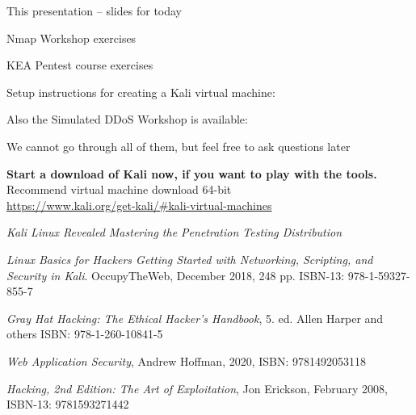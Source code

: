 \documentclass[Screen16to9,17pt]{foils}
\begin{document}

\begin{list2}
\item This presentation -- slides for today


\item Nmap Workshop exercises\\{\footnotesize
{}}
\item KEA Pentest course exercises\\{\footnotesize
{}}
\item Setup instructions for creating a Kali virtual machine:\\
\item Also the Simulated DDoS Workshop is available:\\{\footnotesize
{}}

\end{list2}

\centerline{We cannot go through all of them, but feel free to ask questions later}

{\bf Start a download of Kali now, if you want to play with the tools.}\\
Recommend virtual machine download 64-bit\\
 \url{https://www.kali.org/get-kali/#kali-virtual-machines}



\begin{list2}
\item \emph{Kali Linux Revealed Mastering the Penetration Testing Distribution}\\
\item \emph{Linux Basics for Hackers Getting Started with Networking, Scripting, and Security in Kali}. OccupyTheWeb, December 2018, 248 pp. ISBN-13: 978-1-59327-855-7
\item \emph{Gray Hat Hacking: The Ethical Hacker's Handbook}, 5. ed. Allen Harper and others ISBN: 978-1-260-10841-5
\item \emph{Web Application Security}, Andrew Hoffman, 2020, ISBN: 9781492053118
\item \emph{Hacking, 2nd Edition: The Art of Exploitation}, Jon Erickson, February 2008, ISBN-13: 9781593271442
\end{list2}
\end{document}
